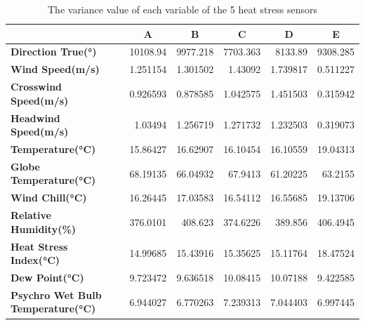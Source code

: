 \documentclass[a4paper]{article}
\begin{document}
\begin{table}[htbp]
\footnotesize
  \centering
  \caption{The variance value of each variable of the 5 heat stress sensors}
    \begin{tabular}{lrrrrr}
    \toprule
          & \multicolumn{1}{c}{\textbf{A}} & \multicolumn{1}{c}{\textbf{B}} & \multicolumn{1}{c}{\textbf{C}} & \multicolumn{1}{c}{\textbf{D}} & \multicolumn{1}{c}{\textbf{E}} \\
    \midrule
    \textbf{Direction True(°)} & \cellcolor[rgb]{ .98,  .502,  .447}10108.94 & 9977.218 & \cellcolor[rgb]{ .608,  .804,  .608}7703.363 & 8133.89 & 9308.285 \\
    \textbf{Wind Speed(m/s)} & 1.251154 & 1.301502 & 1.43092 & \cellcolor[rgb]{ .98,  .502,  .447}1.739817 & \cellcolor[rgb]{ .608,  .804,  .608}0.511227 \\
    \textbf{Crosswind Speed(m/s)} & 0.926593 & 0.878585 & 1.042575 & \cellcolor[rgb]{ .98,  .502,  .447}1.451503 & \cellcolor[rgb]{ .608,  .804,  .608}0.315942 \\
    \textbf{Headwind Speed(m/s)} & 1.03494 & 1.256719 & \cellcolor[rgb]{ .98,  .502,  .447}1.271732 & 1.232503 & \cellcolor[rgb]{ .608,  .804,  .608}0.319073 \\
    \textbf{Temperature(°C)} & \cellcolor[rgb]{ .608,  .804,  .608}15.86427 & 16.62907 & 16.10454 & 16.10559 & \cellcolor[rgb]{ .98,  .502,  .447}19.04313 \\
    \textbf{Globe Temperature(°C)} & \cellcolor[rgb]{ .98,  .502,  .447}68.19135 & 66.04932 & 67.9413 & \cellcolor[rgb]{ .608,  .804,  .608}61.20225 & 63.2155 \\
    \textbf{Wind Chill(°C)} & \cellcolor[rgb]{ .608,  .804,  .608}16.26445 & 17.03583 & 16.54112 & 16.55685 & \cellcolor[rgb]{ .98,  .502,  .447}19.13706 \\
    \textbf{Relative Humidity(\%)} & 376.0101 & \cellcolor[rgb]{ .98,  .502,  .447}408.623 & \cellcolor[rgb]{ .608,  .804,  .608}374.6226 & 389.856 & 406.4945 \\
    \textbf{Heat Stress Index(°C)} & \cellcolor[rgb]{ .608,  .804,  .608}14.99685 & 15.43916 & 15.35625 & 15.11764 & \cellcolor[rgb]{ .98,  .502,  .447}18.47524 \\
    \textbf{Dew Point(°C)} & 9.723472 & 9.636518 & 10.08415 & 10.07188 & \cellcolor[rgb]{ .608,  .804,  .608}9.422585 \\
    \textbf{Psychro Wet Bulb Temperature(°C)} & 6.944027 & \cellcolor[rgb]{ .608,  .804,  .608}6.770263 & \cellcolor[rgb]{ .98,  .502,  .447}7.239313 & 7.044403 & 6.997445 \\

\end{tabular}
\end{table}
\end{document}
